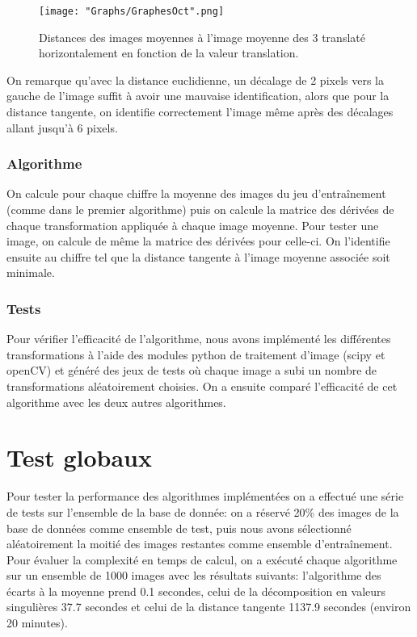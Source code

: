 \documentclass[a4paper,11pt,twoside]{report}
\begin{document}
\begin{figure}[H]
  	\texttt{[image: "Graphs/GraphesOct".png]}
  	\caption{Distances des images moyennes à l'image moyenne des 3 translaté horizontalement en fonction de la valeur translation.}
\end{figure}

On remarque qu'avec la distance euclidienne, un décalage de 2 pixels vers la gauche de l'image suffit à avoir une mauvaise identification, alors que pour la distance tangente, on identifie correctement l'image même après des décalages allant jusqu'à 6 pixels.


\subsection{Algorithme}
On calcule pour chaque chiffre la moyenne des images du jeu d'entraînement (comme dans le premier algorithme) puis on calcule la matrice des dérivées de chaque transformation appliquée à chaque image moyenne. Pour tester une image, on calcule de même la matrice des dérivées pour celle-ci. On l'identifie ensuite au chiffre tel que la distance tangente à l'image moyenne associée soit minimale.



\subsection{Tests}
Pour vérifier l'efficacité de l'algorithme, nous avons implémenté les différentes transformations à l'aide des modules python de traitement d'image (scipy et openCV) et généré des jeux de tests où chaque image a subi un nombre de transformations aléatoirement choisies. On a ensuite comparé l'efficacité de cet algorithme avec les deux autres algorithmes.


\chapter{Test globaux}

Pour tester la performance des algorithmes implémentées on a effectué une série de tests sur l'ensemble de la base de donnée: on a réservé 20\% des images de la base de données comme ensemble de test, puis nous avons sélectionné aléatoirement la moitié des images restantes comme ensemble d’entraînement.\\
Pour évaluer la complexité en temps de calcul, on a exécuté chaque algorithme sur un ensemble de 1000 images avec les résultats suivants: l'algorithme des écarts à la moyenne prend 0.1 secondes, celui de la décomposition en valeurs singulières 37.7 secondes et celui de la distance tangente 1137.9 secondes (environ 20 minutes).
\end{document}
